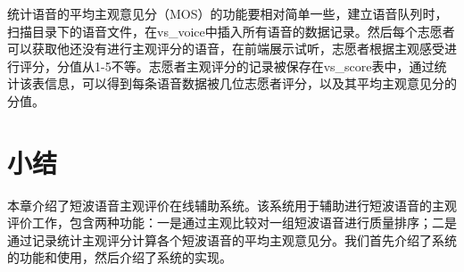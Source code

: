 统计语音的平均主观意见分（MOS）的功能要相对简单一些，建立语音队列时，扫描目录下的语音文件，在vs\_voice中插入所有语音的数据记录。然后每个志愿者可以获取他还没有进行主观评分的语音，在前端展示试听，志愿者根据主观感受进行评分，分值从1-5不等。志愿者主观评分的记录被保存在vs\_score表中，通过统计该表信息，可以得到每条语音数据被几位志愿者评分，以及其平均主观意见分的分值。

\section{小结}

本章介绍了短波语音主观评价在线辅助系统。该系统用于辅助进行短波语音的主观评价工作，包含两种功能：一是通过主观比较对一组短波语音进行质量排序；二是通过记录统计主观评分计算各个短波语音的平均主观意见分。我们首先介绍了系统的功能和使用，然后介绍了系统的实现。